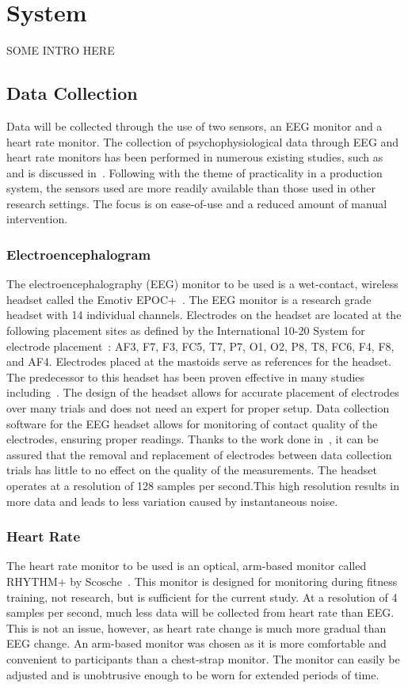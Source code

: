 \documentclass[11pt]{article}
\begin{document}
\section{System}
SOME INTRO HERE

\subsection{Data Collection}
Data will be collected through the use of two sensors, an EEG monitor and a heart rate monitor. The collection of psychophysiological data through EEG and heart rate monitors has been performed in numerous existing studies, such as~\cite{Wilson, Yang, Wang_Z} and is discussed in~\cite{Sweller}. Following with the theme of practicality in a production system, the sensors used are more readily available than those used in other research settings. The focus is on ease-of-use and a reduced amount of manual intervention.

\subsubsection{Electroencephalogram}
The electroencephalography (EEG) monitor to be used is a wet-contact, wireless headset called the Emotiv EPOC+~\cite{Emotiv}. The EEG monitor is a research grade headset with 14 individual channels. Electrodes on the headset are located at the following placement sites as defined by the International 10-20 System for electrode placement~\cite{Jasper}: AF3, F7, F3, FC5, T7, P7, O1, O2, P8, T8, FC6, F4, F8, and AF4. Electrodes placed at the mastoids serve as references for the headset. The predecessor to this headset has been proven effective in many studies including~\cite{Knoll}. The design of the headset allows for accurate placement of electrodes over many trials and does not need an expert for proper setup. Data collection software for the EEG headset allows for monitoring of contact quality of the electrodes, ensuring proper readings. Thanks to the work done in~\cite{Estepp_2015}, it can be assured that the removal and replacement of electrodes between data collection trials has little to no effect on the quality of the measurements. The headset operates at a resolution of 128 samples per second.This high resolution results in more data and leads to less variation caused by instantaneous noise.

\subsubsection{Heart Rate}
The heart rate monitor to be used is an optical, arm-based monitor called RHYTHM+ by Scosche~\cite{Scosche}. This monitor is designed for monitoring during fitness training, not research, but is sufficient for the current study. At a resolution of 4 samples per second, much less data will be collected from heart rate than EEG. This is not an issue, however, as heart rate change is much more gradual than EEG change. An arm-based monitor was chosen as it is more comfortable and convenient to participants than a chest-strap monitor. The monitor can easily be adjusted and is unobtrusive enough to be worn for extended periods of time.
\end{document}

